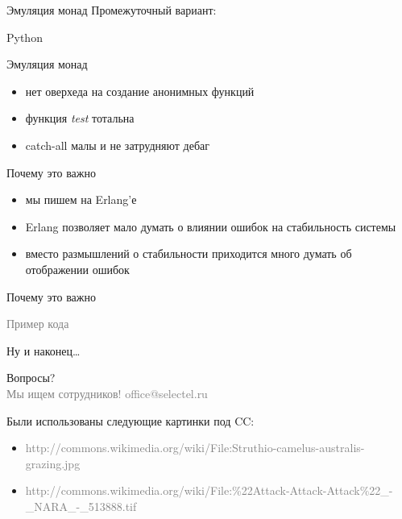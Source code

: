 \documentclass[10pt]{beamer}
\newcommand{\light}[1]{\textcolor{gray}{\footnotesize{#1}}}
\begin{document}
\begin{frame}{Эмуляция монад}
  Промежуточный вариант:
  \begin{block}{Python}
    \centering
    \small
    \lstset{language=python}
    
  \end{block}
\end{frame}

\begin{frame}{Эмуляция монад}
  \begin{itemize}
  \item нет оверхеда на создание анонимных функций
  \item функция \emph{test} тотальна
  \item catch-all малы и не затрудняют дебаг
  \end{itemize}
\end{frame}

\begin{frame}{Почему это важно}
  \begin{itemize}
  \item мы пишем на Erlang'е
  \item Erlang позволяет мало думать о влиянии ошибок на стабильность системы
  \item вместо размышлений о стабильности приходится много думать об отображении ошибок
  \end{itemize}
\end{frame}

\begin{frame}{Почему это важно}
  \begin{center}
    \light{Пример кода}
  \end{center}
\end{frame}

\begin{frame}{Ну и наконец…}
  \begin{center}
    \huge Вопросы?\\
    \light{Мы ищем сотрудников! office@selectel.ru}
  \end{center}
\end{frame}

\begin{frame}{}
  Были использованы следующие картинки под CC:
  \begin{itemize}
  \item \light{http://commons.wikimedia.org/wiki/File:Struthio-camelus-australis-grazing.jpg}
  \item \light{http://commons.wikimedia.org/wiki/File:\%22Attack-Attack-Attack\%22\_-\_NARA\_-\_513888.tif}
  \end{itemize}
\end{frame}
\end{document}
